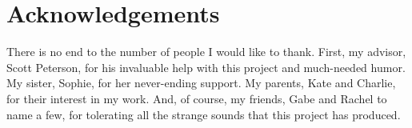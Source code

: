 \documentclass[10pt]{article}
\begin{document}
\section{Acknowledgements}
There is no end to the number of people I would like to thank. First, my advisor, Scott Peterson, for his invaluable help with this project and much-needed humor. My sister, Sophie, for her never-ending support. My parents, Kate and Charlie, for their interest in my work. And, of course, my friends, Gabe and Rachel to name a few, for tolerating all the strange sounds that this project has produced.

\pagebreak


\end{document}
